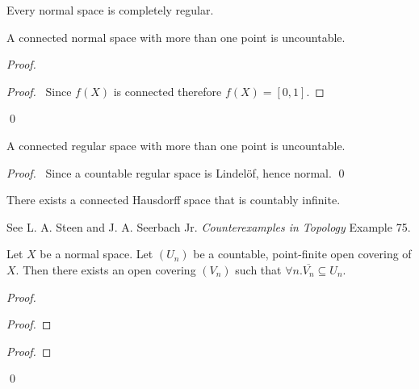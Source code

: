\begin{corollary}
    Every normal space is completely regular.
\end{corollary}

\begin{proposition}
    A connected normal space with more than one point is uncountable.
\end{proposition}

\begin{proof}
    \pf
    \begin{proof}
        \pf\ Since $f(X)$ is connected therefore $f(X) = [0,1]$.
    \end{proof}
    \qed
\end{proof}

\begin{corollary}
    A connected regular space with more than one point is uncountable.
\end{corollary}

\begin{proof}
    \pf\ Since a countable regular space is Lindel\"{o}f, hence normal. \qed
\end{proof}

\begin{example}
    There exists a connected Hausdorff space that is countably infinite.

    See L. A. Steen and J. A. Seerbach Jr. \emph{Counterexamples in
    Topology} Example 75.
\end{example}

\begin{lemma}
    Let $X$ be a normal space. Let $(U_n)$ be a countable, point-finite open covering of $X$.
    Then there exists an open covering $(V_n)$ such that $\forall n. \overline{V_n} \subseteq U_n$.
\end{lemma}

\begin{proof}
    \pf
    \begin{proof}
    \end{proof}
    \begin{proof}
    \end{proof}
    \qed
\end{proof}

